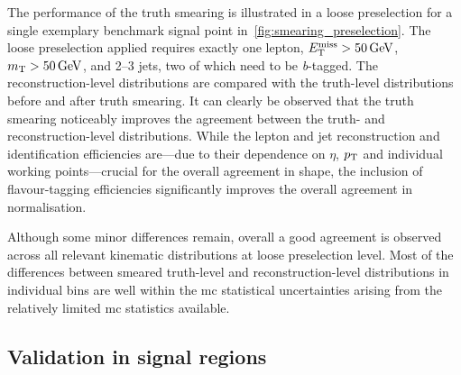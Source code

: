 The performance of the truth smearing is illustrated in a loose preselection for a single exemplary benchmark signal point in~\cref{fig:smearing_preselection}. The loose preselection applied requires exactly one lepton, $\met>\SI{50}{\GeV}$, $\mt > \SI{50}{\GeV}$, and 2--3 jets, two of which need to be \textit{b}-tagged. The reconstruction-level distributions are compared with the truth-level distributions before and after truth smearing. It can clearly be observed that the truth smearing noticeably improves the agreement between the truth- and reconstruction-level distributions. While the lepton and jet reconstruction and identification efficiencies are---due to their dependence on $\eta$, $p_{\textrm{T}}$ and individual working points---crucial for the overall agreement in shape, the inclusion of flavour-tagging efficiencies significantly improves the overall agreement in normalisation.
 
Although some minor differences remain, overall a good agreement is observed across all relevant kinematic distributions at loose preselection level. Most of the differences between smeared truth-level and reconstruction-level distributions in individual bins are well within the \gls{mc} statistical uncertainties arising from the relatively limited \gls{mc} statistics available.
 
 \subsection{Validation in signal regions}

